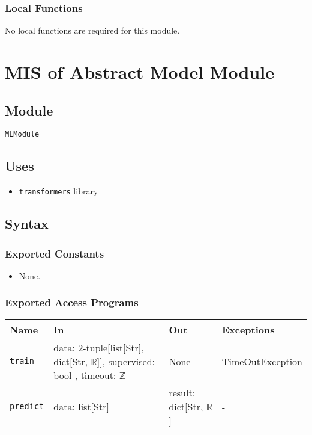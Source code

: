 \documentclass[12pt, titlepage]{article}
\begin{document}
\subsubsection{Local Functions}
No local functions are required for this module.



\section{MIS of Abstract Model Module} \label{smMLModel} %

\subsection{Module}

\texttt{MLModule}

\subsection{Uses}

\begin{itemize}
    \item \texttt{transformers} library
\end{itemize}

\subsection{Syntax}

\subsubsection{Exported Constants}

\begin{itemize}
    \item None.
\end{itemize}

\subsubsection{Exported Access Programs}

\begin{center}
\begin{tabular}{p{5cm} p{3.5cm} p{3.5cm} p{2cm}}
\hline
\textbf{Name} & \textbf{In} & \textbf{Out} & \textbf{Exceptions} \\
\hline
\texttt{train} & data: 2-tuple[list[Str], dict[Str, $\mathbb{R}$]], supervised: bool , timeout: $\mathbb{Z}$  & None & TimeOutException \\
\texttt{predict} & data: list[Str] & result: dict[Str, $\mathbb{R}$] & - \\
\hline
\end{tabular}
\end{center}
\end{document}
